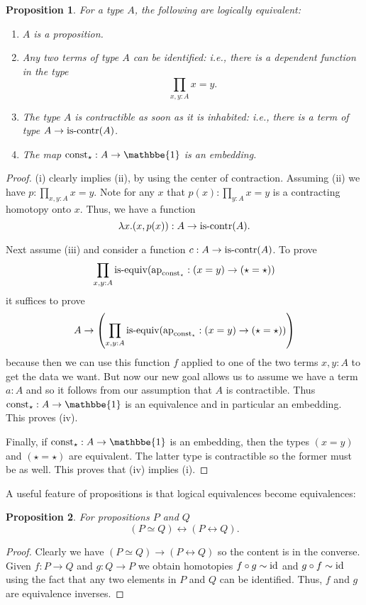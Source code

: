 \documentclass{amsart}
\theoremstyle{theorem}
\newtheorem*{prop}{Proposition}
\theoremstyle{definition}
\theoremstyle{remark}
\newcommand{\0}{\mathbbe{0}}
\newcommand{\1}{\mathbbe{1}}
\newcommand{\2}{\mathbbe{2}}
\newcommand{\3}{\mathbbe{3}}
\newcommand{\4}{\mathbbe{4}}
\newcommand{\term}[1]{{\textup{#1}}}
\newcommand{\type}[1]{{\textup{#1}}}
\newcommand{\id}{\term{id}}
\newcommand{\ap}{\term{ap}}
\newcommand{\iscontr}{\type{is-contr}}
\newcommand{\isequiv}{\type{is-equiv}}
\renewcommand{\iff}{\leftrightarrow}
\begin{document}
\begin{prop} For a type $A$, the following are logically equivalent:
\begin{enumerate}
\item $A$ is a proposition.
\item Any two terms of type $A$ can be identified: i.e., there is a dependent function in the type
\[ \prod_{x,y:A} x=y.\]
\item The type $A$ is contractible as soon as it is inhabited: i.e., there is a term of type $A \to \iscontr(A)$.
\item The map $\term{const}_\star : A \to \1$ is an embedding.
\end{enumerate}
\end{prop}
\begin{proof}
(i) clearly implies (ii), by using the center of contraction. Assuming (ii) we have $p : \prod_{x,y:A} x= y$. Note for any $x$ that $p(x) : \prod_{y :A} x=y$ is a contracting homotopy onto $x$. Thus, we have a function
\[ \lambda x. (x,p(x)) : A \to \iscontr(A).\]

Next assume (iii) and consider a function $c : A\to \iscontr(A)$. To prove
\[ \prod_{x,y :A} \isequiv (\ap_{\term{const}_\star} : (x=y) \to (\star = \star))\] it suffices to prove
\[ A \to \left(\prod_{x,y :A} \isequiv (\ap_{\term{const}_\star} : (x=y) \to (\star = \star))\right)\]
because then we can use this function $f$ applied to one of the two terms $x,y : A$ to get the data we want. But now our new goal allows us to assume we have a term $a:A$ and so it follows from our assumption that $A$ is contractible. Thus $\term{const}_\star : A \to \1$ is an equivalence and in particular an embedding. This proves (iv).

Finally, if $\term{const}_\star : A \to \1$ is an embedding, then the types $(x=y)$ and $(\star=\star)$ are equivalent. The latter type is contractible so the former must be as well. This proves that (iv) implies (i).
\end{proof}

A useful feature of propositions is that logical equivalences become equivalences:

\begin{prop} For propositions $P$ and $Q$
\[ (P \simeq Q) \iff (P \iff Q).\]
\end{prop}
\begin{proof}
Clearly we have $(P \simeq Q) \to (P \iff Q)$ so the content is in the converse. Given $f : P \to Q$ and $g : Q \to P$ we obtain homotopies $f \circ g \sim \id$ and $g \circ f \sim \id$ using the fact that any two elements in $P$ and $Q$ can be identified. Thus, $f$ and $g$ are equivalence inverses.
\end{proof}
\end{document}
